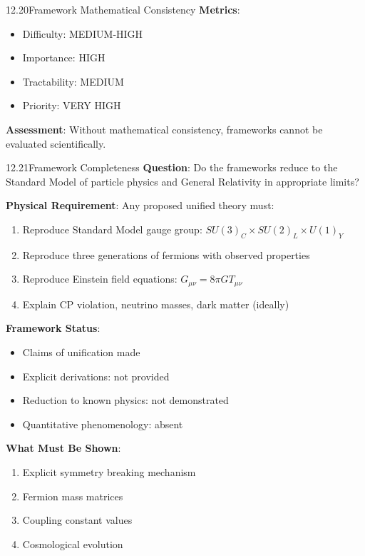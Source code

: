 \begin{openproblem}{12.20}{Framework Mathematical Consistency}
\textbf{Metrics}:
\begin{itemize}
    \item Difficulty: MEDIUM-HIGH
    \item Importance: HIGH
    \item Tractability: MEDIUM
    \item Priority: VERY HIGH
\end{itemize}

\textbf{Assessment}: Without mathematical consistency, frameworks cannot be evaluated scientifically.
\end{openproblem}

\begin{openproblem}{12.21}{Framework Completeness}
\textbf{Question}: Do the frameworks reduce to the Standard Model of particle physics and General Relativity in appropriate limits?

\textbf{Physical Requirement}:
Any proposed unified theory must:
\begin{enumerate}
    \item Reproduce Standard Model gauge group: $SU(3)_C \times SU(2)_L \times U(1)_Y$
    \item Reproduce three generations of fermions with observed properties
    \item Reproduce Einstein field equations: $G_{\mu\nu} = 8\pi G T_{\mu\nu}$
    \item Explain CP violation, neutrino masses, dark matter (ideally)
\end{enumerate}

\textbf{Framework Status}:
\begin{itemize}
    \item Claims of unification made
    \item Explicit derivations: not provided
    \item Reduction to known physics: not demonstrated
    \item Quantitative phenomenology: absent
\end{itemize}

\textbf{What Must Be Shown}:
\begin{enumerate}
    \item Explicit symmetry breaking mechanism
    \item Fermion mass matrices
    \item Coupling constant values
    \item Cosmological evolution
\end{enumerate}


\end{openproblem}
